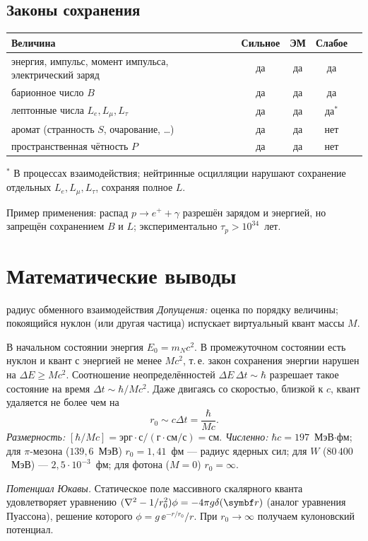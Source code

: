 \subsection{Законы сохранения}

\begin{center}
\small
\begin{tabular}{@{}lcccc@{}}
\toprule
Величина & Сильное & ЭМ & Слабое \\
\midrule
энергия, импульс, момент импульса, электрический заряд & да & да & да \\
барионное число $B$ & да & да & да \\
лептонные числа $L_e,L_\mu,L_\tau$ & да & да & да$^{*}$ \\
аромат (странность $S$, очарование, \dots) & да & да & нет \\
пространственная чётность $P$ & да & да & нет \\
\bottomrule
\end{tabular}

{\footnotesize $^{*}$ В процессах взаимодействия; нейтринные осцилляции нарушают сохранение отдельных $L_e,L_\mu,L_\tau$,
сохраняя полное $L$.}
\end{center}
Пример применения: распад $p\to e^++\gamma$ разрешён зарядом и энергией, но запрещён сохранением $B$ и $L$;
экспериментально $\tau_p>10^{34}$~лет.

\section{Математические выводы}

\begin{derivation}[label=der:14:yukawa]{радиус обменного взаимодействия}
\emph{Допущения:} оценка по порядку величины; покоящийся нуклон (или другая частица) испускает
виртуальный квант массы $M$.

В начальном состоянии энергия $E_0=m_Nc^2$. В промежуточном состоянии есть нуклон и квант с энергией
не менее $Mc^2$, т.\,е. закон сохранения энергии нарушен на $\Delta E\ge Mc^2$. Соотношение неопределённостей
$\Delta E\,\Delta t\sim\hbar$ разрешает такое состояние на время $\Delta t\sim\hbar/Mc^2$. Даже двигаясь со скоростью,
близкой к $c$, квант удаляется не более чем на
\[
  r_0\sim c\Delta t=\frac{\hbar}{Mc}.
\]
\emph{Размерность:} $[\hbar/Mc]=\text{эрг}\cdot\text{с}/(\text{г}\cdot\text{см}/\text{с})=\text{см}$.
\emph{Численно:} $\hbar c=197$~МэВ$\cdot$фм; для $\pi$-мезона ($139{,}6$~МэВ) $r_0=1{,}41$~фм — радиус ядерных
сил; для $W$ ($80\,400$~МэВ) — $2{,}5\cdot10^{-3}$~фм; для фотона ($M=0$) $r_0=\infty$.

\emph{Потенциал Юкавы.} Статическое поле массивного скалярного кванта удовлетворяет уравнению
$(\nabla^2-1/r_0^2)\phi=-4\pi g\delta(\vect r)$ (аналог уравнения Пуассона), решение которого
$\phi=g\,\ee^{-r/r_0}/r$. При $r_0\to\infty$ получаем кулоновский потенциал.
\end{derivation}

